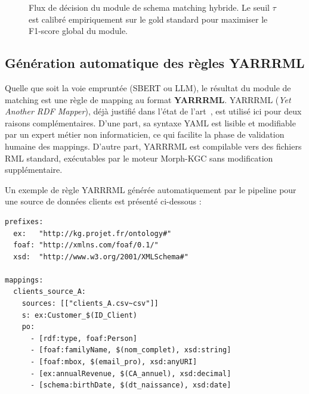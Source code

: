 \begin{figure}[ht]
{
    } %
    
    \vspace{0.3cm}
    \caption{Flux de décision du module de schema matching hybride.
             Le seuil $\tau$ est calibré empiriquement sur le gold standard
             pour maximiser le F1-score global du module.}
    \label{fig:schema_matching_detail}
\end{figure}

\subsection{Génération automatique des règles YARRRML}

Quelle que soit la voie empruntée (SBERT ou LLM), le résultat du module de
matching est une règle de mapping au format \textbf{YARRRML}.
YARRRML (\textit{Yet Another RDF Mapper}), déjà justifié dans
l'état de l'art~\cite{warren2024yarrrml}, est utilisé ici pour deux raisons
complémentaires.
D'une part, sa syntaxe YAML est lisible et modifiable par un expert métier non
informaticien, ce qui facilite la phase de validation humaine des mappings.
D'autre part, YARRRML est compilable vers des fichiers RML standard, exécutables
par le moteur Morph-KGC sans modification supplémentaire.

Un exemple de règle YARRRML générée automatiquement par le pipeline pour une
source de données clients est présenté ci-dessous :

\begin{verbatim}
prefixes:
  ex:   "http://kg.projet.fr/ontology#"
  foaf: "http://xmlns.com/foaf/0.1/"
  xsd:  "http://www.w3.org/2001/XMLSchema#"

mappings:
  clients_source_A:
    sources: [["clients_A.csv~csv"]]
    s: ex:Customer_$(ID_Client)
    po:
      - [rdf:type, foaf:Person]
      - [foaf:familyName, $(nom_complet), xsd:string]
      - [foaf:mbox, $(email_pro), xsd:anyURI]
      - [ex:annualRevenue, $(CA_annuel), xsd:decimal]
      - [schema:birthDate, $(dt_naissance), xsd:date]
\end{verbatim}

